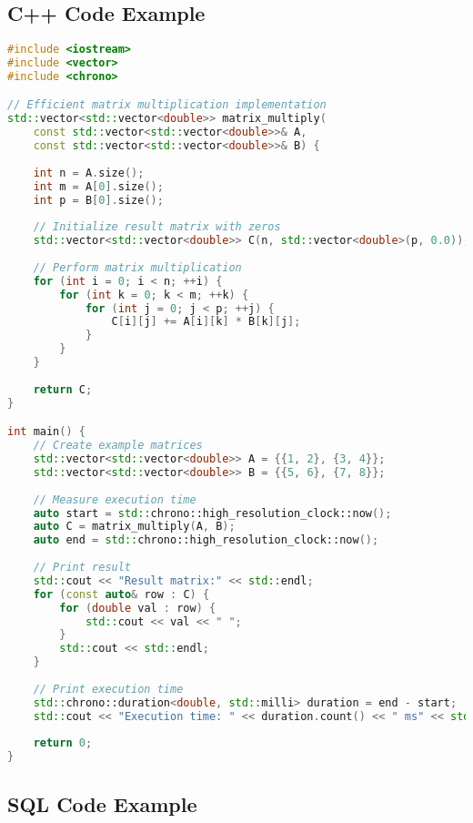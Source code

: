 \documentclass[a4paper,11pt]{article}
\begin{document}
\subsection{C++ Code Example}

\begin{lstlisting}[language=C++, caption=Efficient Matrix Multiplication, label=lst:cpp]
#include <iostream>
#include <vector>
#include <chrono>

// Efficient matrix multiplication implementation
std::vector<std::vector<double>> matrix_multiply(
    const std::vector<std::vector<double>>& A,
    const std::vector<std::vector<double>>& B) {
    
    int n = A.size();
    int m = A[0].size();
    int p = B[0].size();
    
    // Initialize result matrix with zeros
    std::vector<std::vector<double>> C(n, std::vector<double>(p, 0.0));
    
    // Perform matrix multiplication
    for (int i = 0; i < n; ++i) {
        for (int k = 0; k < m; ++k) {
            for (int j = 0; j < p; ++j) {
                C[i][j] += A[i][k] * B[k][j];
            }
        }
    }
    
    return C;
}

int main() {
    // Create example matrices
    std::vector<std::vector<double>> A = {{1, 2}, {3, 4}};
    std::vector<std::vector<double>> B = {{5, 6}, {7, 8}};
    
    // Measure execution time
    auto start = std::chrono::high_resolution_clock::now();
    auto C = matrix_multiply(A, B);
    auto end = std::chrono::high_resolution_clock::now();
    
    // Print result
    std::cout << "Result matrix:" << std::endl;
    for (const auto& row : C) {
        for (double val : row) {
            std::cout << val << " ";
        }
        std::cout << std::endl;
    }
    
    // Print execution time
    std::chrono::duration<double, std::milli> duration = end - start;
    std::cout << "Execution time: " << duration.count() << " ms" << std::endl;
    
    return 0;
}
\end{lstlisting}

\subsection{SQL Code Example}
\end{document}
